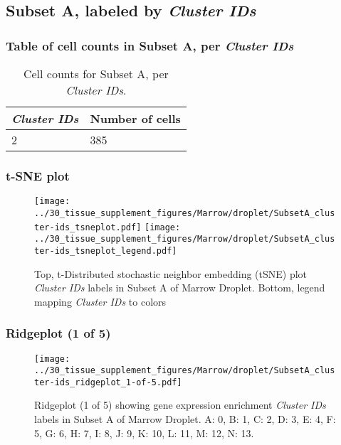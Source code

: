 \clearpage

\subsection{Subset A, labeled by \emph{Cluster IDs}}
\subsubsection{Table of cell counts in Subset A, per \emph{Cluster IDs}}\begin{table}[h]
\centering
\label{my-label}
\begin{tabular}{@{}ll@{}}
\toprule

\emph{Cluster IDs}& Number of cells \\ \midrule
2 & 385 \\
\bottomrule
\end{tabular}
\caption{Cell counts for Subset A, per \emph{Cluster IDs}.}
\end{table}

\clearpage
\subsubsection{t-SNE plot}
\begin{figure}[h]
\centering
\texttt{[image: ../30\_tissue\_supplement\_figures/Marrow/droplet/SubsetA\_cluster-ids\_tsneplot.pdf]}
\texttt{[image: ../30\_tissue\_supplement\_figures/Marrow/droplet/SubsetA\_cluster-ids\_tsneplot\_legend.pdf]}
\caption{Top, t-Distributed stochastic neighbor embedding (tSNE) plot  \emph{Cluster IDs} labels in Subset A of Marrow Droplet. Bottom, legend mapping \emph{Cluster IDs} to colors}
\end{figure}


\clearpage

\subsubsection{Ridgeplot (1 of 5)}
\begin{figure}[h]
\centering
\texttt{[image: ../30\_tissue\_supplement\_figures/Marrow/droplet/SubsetA\_cluster-ids\_ridgeplot\_1-of-5.pdf]}

\caption{ Ridgeplot (1 of 5)  showing gene expression enrichment \emph{Cluster IDs} labels in Subset A of Marrow Droplet. A: 0, B: 1, C: 2, D: 3, E: 4, F: 5, G: 6, H: 7, I: 8, J: 9, K: 10, L: 11, M: 12, N: 13.}
\end{figure}


